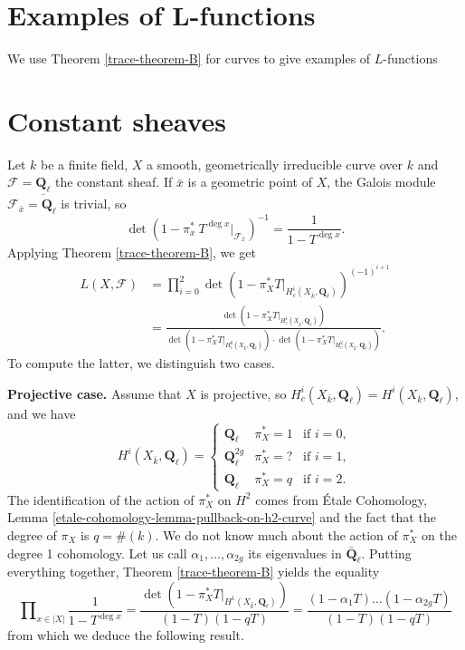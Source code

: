 
\section{Examples of L-functions}
\label{trace-section-examples-L-functions}
We use Theorem \ref{trace-theorem-B} for curves to give examples of $L$-functions

\section{Constant sheaves}
\label{trace-section-L-function-constant-sheaf}
Let $k$ be a finite field, $X$ a smooth, geometrically irreducible curve over
$k$ and $\mathcal{F} = \underline{\mathbf{Q}_\ell}$ the constant sheaf. If
$\bar x$ is a geometric point of $X$, the Galois module
$\mathcal{F}_{\bar x} = \mathbf{Q}_\ell$ is trivial, so
$$
\det(1-\pi_x^*\ T^{\deg x} |_{\mathcal{F}_{\bar x}})^{-1} =
\frac{1}{1-T^{\deg x}}.
$$
Applying Theorem \ref{trace-theorem-B}, we get
\begin{align*}
L(X, \mathcal{F})
& =
\prod_{i = 0}^2
\det(1 - \pi_X^*T |_{H_c^i(X_{\bar k}, \mathbf{Q}_\ell)})^{(-1)^{i+1}} \\
& =
\frac{\det(1 - \pi_X^*T |_{H_c^1(X_{\bar k}, \mathbf{Q}_\ell)})}{
\det(1 - \pi_X^*T |_{H_c^0(X_{\bar k}, \mathbf{Q}_\ell)})
\cdot \det(1 - \pi_X^*T |_{H_c^2(X_{\bar k}, \mathbf{Q}_\ell)})}.
\end{align*}
To compute the latter, we distinguish two cases.


\medskip\noindent
{\bf Projective case.}
Assume that $X$ is projective, so $H_c^i(X_{\bar k}, \mathbf{Q}_\ell) =
H^i(X_{\bar k}, \mathbf{Q}_\ell)$, and we have
$$
H^i(X_{\bar k}, \mathbf{Q}_\ell) =
\left\{
\begin{matrix}
\mathbf{Q}_\ell & \pi_X^* = 1 & \text{if }i = 0, \\
\mathbf{Q}_\ell^{2g} & \pi_X^* = ? & \text{if }i = 1, \\
\mathbf{Q}_\ell & \pi_X^* = q & \text{if }i = 2.
\end{matrix}
\right.
$$
The identification of the action of $\pi_X^*$ on $H^2$ comes from
\'Etale Cohomology, Lemma \ref{etale-cohomology-lemma-pullback-on-h2-curve}
and the fact that the degree
of $\pi_X$ is $q = \#(k)$.
We do not know much about the action of $\pi_X^*$ on the degree 1 cohomology.
Let us call $\alpha_1, \ldots, \alpha_{2g}$ its eigenvalues in
$\bar{\mathbf{Q}}_\ell$. Putting everything together,
Theorem \ref{trace-theorem-B}
yields the equality
$$
\prod\nolimits_{x \in |X|} \frac{1}{1 - T^{\deg x}} =
\frac{\det(1- \pi_X^* T|_{H^1(X_{\bar k}, \mathbf{Q}_\ell)})}{(1-T)(1-qT)} =
\frac{(1 - \alpha_1 T) \ldots (1 - \alpha_{2g}T)}{(1-T)(1-qT)}
$$
from which we deduce the following result.

